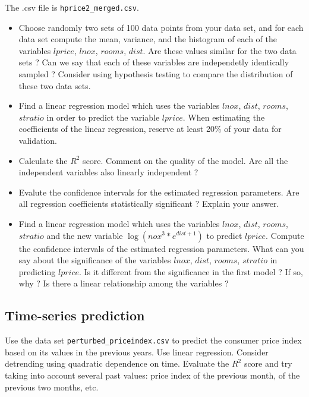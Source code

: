 \documentclass{article}
\begin{document}
   The .csv file is \lstinline$hprice2_merged.csv$.

    
 \begin{itemize}
	 \item Choose randomly two sets of 100 data points from your data set, and for each data set compute the mean, variance, and the histogram
	of each of the variables  $lprice$, $lnox$, $rooms$,  $dist$. 
	Are these values similar for the two data sets ?  Can we say that each of these variables are independetly identically sampled ? 
	Consider using hypothesis testing to compare the distribution of these two data sets.

   \item Find a linear regression model which uses the variables $lnox$, $dist$, $rooms$, $stratio$  in order to predict the variable $lprice$.
     When estimating the coefficients of the linear regression, reserve at least 20\% of your data for validation.
  \item Calculate the $R^2$ score. Comment on the quality of the model. Are all the independent variables also linearly independent ?
  \item Evalute the confidence intervals for the estimated regression parameters. Are all regression coefficients statistically significant ? Explain your answer.
  \item Find a  linear regression model which uses the variables $lnox$, $dist$, $rooms$, $stratio$ and the new variable
	$\log(nox^3*e^{dist+1})$ to predict $lprice$. Compute the confidence intervals of the estimated regression parameters.
	What can you say about the significance of the variables $lnox$, $dist$, $rooms$, $stratio$ in predicting $lprice$.
	Is it different from the significance in the first model ? If so, why ? Is there a linear relationship among the variables ? 
  \end{itemize}

   
 \subsection*{Time-series prediction}
   Use the data set \lstinline$perturbed_priceindex.csv$
    to predict the consumer price index 
   based on its values in the previous years.    Use linear regression.
   Consider detrending using quadratic dependence on time.  
   Evaluate the $R^2$ score and try taking into account several past values: price index  of the previous month, of the previous two months, etc. 
\end{document}

